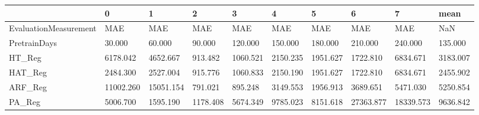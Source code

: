 \begin{tabular}{llllllllll}
\toprule
{} &         0 &         1 &        2 &        3 &        4 &        5 &         6 &         7 &     mean \\
\midrule
EvaluationMeasurement &       MAE &       MAE &      MAE &      MAE &      MAE &      MAE &       MAE &       MAE &      NaN \\
PretrainDays          &    30.000 &    60.000 &   90.000 &  120.000 &  150.000 &  180.000 &   210.000 &   240.000 &  135.000 \\
HT\_Reg                &  6178.042 &  4652.667 &  913.482 & 1060.521 & 2150.235 & 1951.627 &  1722.810 &  6834.671 & 3183.007 \\
HAT\_Reg               &  2484.300 &  2527.004 &  915.776 & 1060.833 & 2150.190 & 1951.627 &  1722.810 &  6834.671 & 2455.902 \\
ARF\_Reg               & 11002.260 & 15051.154 &  791.021 &  895.248 & 3149.553 & 1956.913 &  3689.651 &  5471.030 & 5250.854 \\
PA\_Reg                &  5006.700 &  1595.190 & 1178.408 & 5674.349 & 9785.023 & 8151.618 & 27363.877 & 18339.573 & 9636.842 \\
\bottomrule
\end{tabular}
